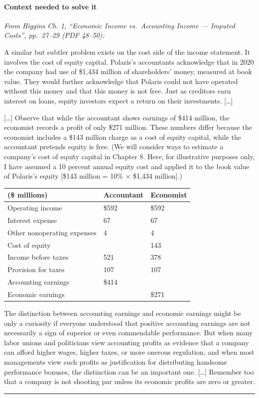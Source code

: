 \documentclass[11pt,a4paper]{article}
\newcommand{\stmtend}{\par\endgroup\nopagebreak\noindent\rule{\linewidth}{0.4pt}\par\medskip}
\begin{document}
\paragraph{Context needed to solve it}

\emph{From Higgins Ch. 1, ``Economic Income vs.~Accounting Income --- Imputed Costs'', pp.~27--29
(PDF 48--50):}

A similar but subtler problem exists on the cost side of the income statement. It involves the cost
of equity capital. Polaris's accountants acknowledge that in 2020 the company had use of \$1,434
million of shareholders' money, measured at book value. They would further acknowledge that Polaris
could not have operated without this money and that this money is not free. Just as creditors earn
interest on loans, equity investors expect a return on their investments. {[}\ldots{]}

{[}\ldots{]} Observe that while the accountant shows earnings of \$414 million, the economist
records a profit of only \$271 million. These numbers differ because the economist includes a \$143
million charge as a cost of equity capital, while the accountant pretends equity is free. (We will
consider ways to estimate a company's cost of equity capital in Chapter 8. Here, for illustrative
purposes only, I have assumed a 10 percent annual equity cost and applied it to the book value of
Polaris's equity {[}\$143 million = 10\% × \$1,434 million{]}.)

{\def\LTcaptype{none} %
\begin{longtable}[]{@{}lll@{}}
\toprule\noalign{}
(\$ millions) & Accountant & Economist \\
\midrule\noalign{}
\endhead
\bottomrule\noalign{}
\endlastfoot
Operating income & \$592 & \$592 \\
Interest expense & 67 & 67 \\
Other nonoperating expenses & 4 & 4 \\
Cost of equity & & 143 \\
Income before taxes & 521 & 378 \\
Provision for taxes & 107 & 107 \\
Accounting earnings & \$414 & \\
Economic earnings & & \$271 \\
\end{longtable}
}

The distinction between accounting earnings and economic earnings might be only a curiosity if
everyone understood that positive accounting earnings are not necessarily a sign of superior or even
commendable performance. But when many labor unions and politicians view accounting profits as
evidence that a company can afford higher wages, higher taxes, or more onerous regulation, and when
most managements view such profits as justification for distributing handsome performance bonuses,
the distinction can be an important one. {[}\ldots{]} Remember too that a company is not shooting
par unless its economic profits are zero or greater.
\stmtend
\end{document}
